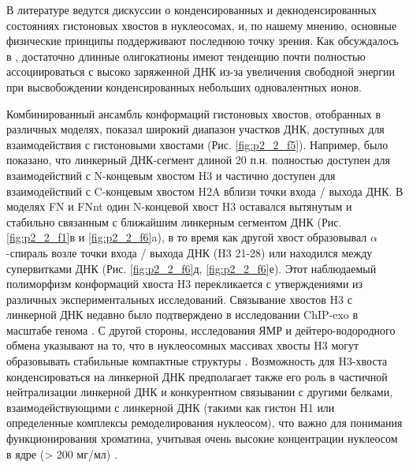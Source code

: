    В литературе ведутся дискуссии о конденсированных и декноденсированных состояниях гистоновых хвостов в нуклеосомах, и, по нашему мнению, основные физические принципы поддерживают последнюю точку зрения. Как обсуждалось в \cite{iwaki_how_2007,korolev_physicochemical_2007}, достаточно длинные олигокатионы имеют тенденцию почти полностью ассоциироваться с высоко заряженной ДНК из-за увеличения свободной энергии при высвобождении конденсированных небольших одновалентных ионов.

    Комбинированный ансамбль конформаций гистоновых хвостов, отобранных в различных моделях, показал широкий диапазон участков ДНК, доступных для взаимодействия с гистоновыми хвостами (Рис. \ref{fig:p2_2_f5}). Например, было показано, что линкерный ДНК-сегмент длиной 20 п.н. полностью доступен для взаимодействий с N-концевым хвостом H3 и частично доступен для взаимодействий с C-концевым хвостом H2A вблизи точки входа / выхода ДНК. В моделях FN и FNnt один N-концевой хвост H3 оставался вытянутым и стабильно связанным с ближайшим линкерным сегментом ДНК (Рис. \ref{fig:p2_2_f1}в и \ref{fig:p2_2_f6}a), в то время как другой хвост образовывал $\alpha$-спираль возле точки входа / выхода ДНК (H3 21-28) или находился между супервитками ДНК (Рис. \ref{fig:p2_2_f6}д, \ref{fig:p2_2_f6}е). Этот наблюдаемый полиморфизм конформаций хвоста H3 перекликается с утверждениями из различных экспериментальных исследований. Связывание хвостов H3 с линкерной ДНК недавно было подтверждено в исследовании ChIP-exo в масштабе генома \cite{rhee_subnucleosomal_2014}. С другой стороны, исследования ЯМР и дейтеро-водородного обмена указывают на то, что в нуклеосомных массивах хвосты H3 могут образовывать стабильные компактные структуры \cite{kato_characterization_2009}. Возможность для H3-хвоста конденсироваться на линкерной ДНК предполагает также его роль в частичной нейтрализации линкерной ДНК и конкурентном связывании с другими белками, взаимодействующими с линкерной ДНК (такими как гистон H1 или определенные комплексы ремоделирования нуклеосом), что важно для понимания функционирования хроматина, учитывая очень высокие концентрации нуклеосом в ядре (> 200 мг/мл) \cite{dehghani_organization_2005}.






